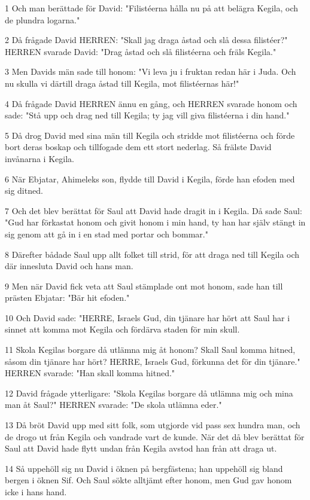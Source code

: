 \par 1 Och man berättade för David: "Filistéerna hålla nu på att belägra Kegila, och de plundra logarna."
\par 2 Då frågade David HERREN: "Skall jag draga åstad och slå dessa filistéer?" HERREN svarade David: "Drag åstad och slå filistéerna och fräls Kegila."
\par 3 Men Davids män sade till honom: "Vi leva ju i fruktan redan här i Juda. Och nu skulla vi därtill draga åstad till Kegila, mot filistéernas här!"
\par 4 Då frågade David HERREN ännu en gång, och HERREN svarade honom och sade: "Stå upp och drag ned till Kegila; ty jag vill giva filistéerna i din hand."
\par 5 Då drog David med sina män till Kegila och stridde mot filistéerna och förde bort deras boskap och tillfogade dem ett stort nederlag. Så frälste David invånarna i Kegila.
\par 6 När Ebjatar, Ahimeleks son, flydde till David i Kegila, förde han efoden med sig ditned.
\par 7 Och det blev berättat för Saul att David hade dragit in i Kegila. Då sade Saul: "Gud har förkastat honom och givit honom i min hand, ty han har själv stängt in sig genom att gå in i en stad med portar och bommar."
\par 8 Därefter bådade Saul upp allt folket till strid, för att draga ned till Kegila och där innesluta David och hans man.
\par 9 Men när David fick veta att Saul stämplade ont mot honom, sade han till prästen Ebjatar: "Bär hit efoden."
\par 10 Och David sade: "HERRE, Israels Gud, din tjänare har hört att Saul har i sinnet att komma mot Kegila och fördärva staden för min skull.
\par 11 Skola Kegilas borgare då utlämna mig åt honom? Skall Saul komma hitned, såsom din tjänare har hört? HERRE, Israels Gud, förkunna det för din tjänare." HERREN svarade: "Han skall komma hitned."
\par 12 David frågade ytterligare: "Skola Kegilas borgare då utlämna mig och mina man åt Saul?" HERREN svarade: "De skola utlämna eder."
\par 13 Då bröt David upp med sitt folk, som utgjorde vid pass sex hundra man, och de drogo ut från Kegila och vandrade vart de kunde. När det då blev berättat för Saul att David hade flytt undan från Kegila avstod han från att draga ut.
\par 14 Så uppehöll sig nu David i öknen på bergfästena; han uppehöll sig bland bergen i öknen Sif. Och Saul sökte alltjämt efter honom, men Gud gav honom icke i hans hand.
